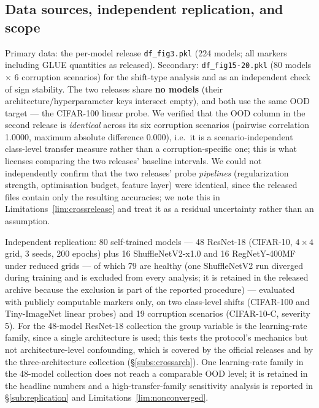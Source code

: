 \documentclass[10pt]{article} %
\newcommand{\srcref}[1]{\S\ref{#1}}
\newcommand{\limref}[1]{Limitations~\ref{#1}}
\begin{document}
\subsection{Data sources, independent replication, and scope}
\label{sub:datasources}

Primary data: the per-model release \texttt{df\_fig3.pkl} (224 models; all markers including GLUE quantities as released). Secondary: \texttt{df\_fig15-20.pkl} (80 models $\times$ 6 corruption scenarios) for the shift-type analysis and as an independent check of sign stability. The two releases share \textbf{no models} (their architecture/hyperparameter keys intersect empty), and both use the same OOD target --- the CIFAR-100 linear probe. We verified that the OOD column in the second release is \emph{identical} across its six corruption scenarios (pairwise correlation 1.0000, maximum absolute difference 0.000), i.e.\ it is a scenario-independent class-level transfer measure rather than a corruption-specific one; this is what licenses comparing the two releases' baseline intervals. We could not independently confirm that the two releases' probe \emph{pipelines} (regularization strength, optimisation budget, feature layer) were identical, since the released files contain only the resulting accuracies; we note this in \limref{lim:crossrelease} and treat it as a residual uncertainty rather than an assumption.

Independent replication: 80 self-trained models --- 48 ResNet-18 (CIFAR-10, $4 \times 4$ grid, 3 seeds, 200 epochs) plus 16 ShuffleNetV2-x1.0 \citep{ma2018shufflenet} and 16 RegNetY-400MF \citep{radosavovic2020designing} under reduced grids --- of which 79 are healthy (one ShuffleNetV2 run diverged during training and is excluded from every analysis; it is retained in the released archive because the exclusion is part of the reported procedure) --- evaluated with publicly computable markers only, on two class-level shifts (CIFAR-100 and Tiny-ImageNet \citep{le2015tiny} linear probes) and 19 corruption scenarios (CIFAR-10-C, severity 5). For the 48-model ResNet-18 collection the group variable is the learning-rate family, since a single architecture is used; this tests the protocol's mechanics but not architecture-level confounding, which is covered by the official releases and by the three-architecture collection (\srcref{subs:crossarch}). One learning-rate family in the 48-model collection does not reach a comparable OOD level; it is retained in the headline numbers and a high-transfer-family sensitivity analysis is reported in \srcref{sub:replication} and \limref{lim:nonconverged}.
\end{document}
